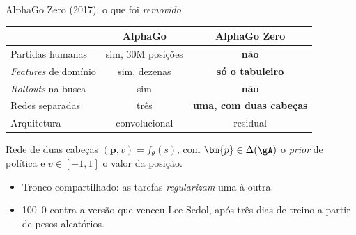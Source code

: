 \documentclass[aspectratio=169, 11pt]{beamer}
\begin{document}
\begin{frame}{AlphaGo Zero (2017): o que foi \emph{removido}}
  \centering
  {\small
  \begin{tabular}{@{}lcc@{}}
    \toprule
    & \textbf{AlphaGo} & \textbf{AlphaGo Zero} \\
    \midrule
    Partidas humanas          & sim, 30M posições & \color{rlVerde!70!black}\bfseries não \\
    \emph{Features} de domínio & sim, dezenas     & \color{rlVerde!70!black}\bfseries só o tabuleiro \\
    \emph{Rollouts} na busca   & sim              & \color{rlVerde!70!black}\bfseries não \\
    Redes separadas            & três             & \color{rlVerde!70!black}\bfseries uma, com duas cabeças \\
    Arquitetura                & convolucional    & residual \\
    \bottomrule
  \end{tabular}}

  \vspace{0.2em}
  \raggedright
  \begin{defbox}{Rede de duas cabeças}
    $(\bm{p}, v) = f_\theta(s)$, com $\bm{p} \in \Delta(\gA)$ o \emph{prior} de
    política e $v \in [-1,1]$ o valor da posição.
  \end{defbox}

  \vspace{-0.3em}
  \begin{itemize}\setlength{\itemsep}{0.2ex}
    \item Tronco compartilhado: as tarefas \emph{regularizam} uma à outra.
    \item 100--0 contra a versão que venceu Lee Sedol, após três dias de treino a partir de pesos aleatórios.
  \end{itemize}
\end{frame}
\end{document}
